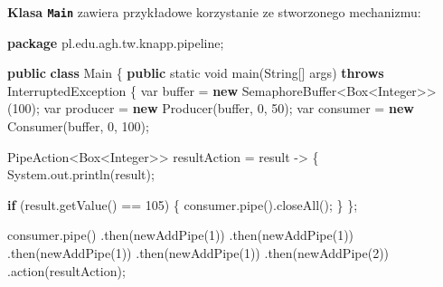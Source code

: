 \documentclass[11pt]{article}
\newenvironment{Shaded}{}{}
\newcommand{\KeywordTok}[1]{\textcolor[rgb]{0.00,0.44,0.13}{\textbf{{#1}}}}
\newcommand{\DataTypeTok}[1]{\textcolor[rgb]{0.56,0.13,0.00}{{#1}}}
\newcommand{\DecValTok}[1]{\textcolor[rgb]{0.25,0.63,0.44}{{#1}}}
\newcommand{\FunctionTok}[1]{\textcolor[rgb]{0.02,0.16,0.49}{{#1}}}
\newcommand{\NormalTok}[1]{{#1}}
\newcommand{\ImportTok}[1]{{#1}}
\newcommand{\ControlFlowTok}[1]{\textcolor[rgb]{0.00,0.44,0.13}{\textbf{{#1}}}}
\newcommand{\OperatorTok}[1]{\textcolor[rgb]{0.40,0.40,0.40}{{#1}}}
\newcommand{\BuiltInTok}[1]{{#1}}
\begin{document}
    \textbf{Klasa \texttt{Main}} zawiera przykładowe korzystanie ze
stworzonego mechanizmu:

\begin{Shaded}
\begin{Highlighting}[]
\KeywordTok{package}\ImportTok{ pl}\OperatorTok{.}\ImportTok{edu}\OperatorTok{.}\ImportTok{agh}\OperatorTok{.}\ImportTok{tw}\OperatorTok{.}\ImportTok{knapp}\OperatorTok{.}\ImportTok{pipeline}\OperatorTok{;}

\KeywordTok{public} \KeywordTok{class}\NormalTok{ Main }\OperatorTok{\{}
    \KeywordTok{public} \DataTypeTok{static} \DataTypeTok{void} \FunctionTok{main}\OperatorTok{(}\BuiltInTok{String}\OperatorTok{[]}\NormalTok{ args}\OperatorTok{)} \KeywordTok{throws} \BuiltInTok{InterruptedException} \OperatorTok{\{}
        \DataTypeTok{var}\NormalTok{ buffer }\OperatorTok{=} \KeywordTok{new}\NormalTok{ SemaphoreBuffer}\OperatorTok{\textless{}}\BuiltInTok{Box}\OperatorTok{\textless{}}\BuiltInTok{Integer}\OperatorTok{\textgreater{}\textgreater{}(}\DecValTok{100}\OperatorTok{);}
        \DataTypeTok{var}\NormalTok{ producer }\OperatorTok{=} \KeywordTok{new} \FunctionTok{Producer}\OperatorTok{(}\NormalTok{buffer}\OperatorTok{,} \DecValTok{0}\OperatorTok{,} \DecValTok{50}\OperatorTok{);}
        \DataTypeTok{var}\NormalTok{ consumer }\OperatorTok{=} \KeywordTok{new} \FunctionTok{Consumer}\OperatorTok{(}\NormalTok{buffer}\OperatorTok{,} \DecValTok{0}\OperatorTok{,} \DecValTok{100}\OperatorTok{);}

\NormalTok{        PipeAction}\OperatorTok{\textless{}}\BuiltInTok{Box}\OperatorTok{\textless{}}\BuiltInTok{Integer}\OperatorTok{\textgreater{}\textgreater{}}\NormalTok{ resultAction }\OperatorTok{=}\NormalTok{ result }\OperatorTok{{-}\textgreater{}} \OperatorTok{\{}
            \BuiltInTok{System}\OperatorTok{.}\FunctionTok{out}\OperatorTok{.}\FunctionTok{println}\OperatorTok{(}\NormalTok{result}\OperatorTok{);}

            \ControlFlowTok{if} \OperatorTok{(}\NormalTok{result}\OperatorTok{.}\FunctionTok{getValue}\OperatorTok{()} \OperatorTok{==} \DecValTok{105}\OperatorTok{)} \OperatorTok{\{}
\NormalTok{                consumer}\OperatorTok{.}\FunctionTok{pipe}\OperatorTok{().}\FunctionTok{closeAll}\OperatorTok{();}
            \OperatorTok{\}}
        \OperatorTok{\};}

\NormalTok{        consumer}\OperatorTok{.}\FunctionTok{pipe}\OperatorTok{()}
                \OperatorTok{.}\FunctionTok{then}\OperatorTok{(}\FunctionTok{newAddPipe}\OperatorTok{(}\DecValTok{1}\OperatorTok{))}
                \OperatorTok{.}\FunctionTok{then}\OperatorTok{(}\FunctionTok{newAddPipe}\OperatorTok{(}\DecValTok{1}\OperatorTok{))}
                \OperatorTok{.}\FunctionTok{then}\OperatorTok{(}\FunctionTok{newAddPipe}\OperatorTok{(}\DecValTok{1}\OperatorTok{))}
                \OperatorTok{.}\FunctionTok{then}\OperatorTok{(}\FunctionTok{newAddPipe}\OperatorTok{(}\DecValTok{1}\OperatorTok{))}
                \OperatorTok{.}\FunctionTok{then}\OperatorTok{(}\FunctionTok{newAddPipe}\OperatorTok{(}\DecValTok{2}\OperatorTok{))}
                \OperatorTok{.}\FunctionTok{action}\OperatorTok{(}\NormalTok{resultAction}\OperatorTok{);}


\end{Highlighting}
\end{Shaded}
\end{document}
